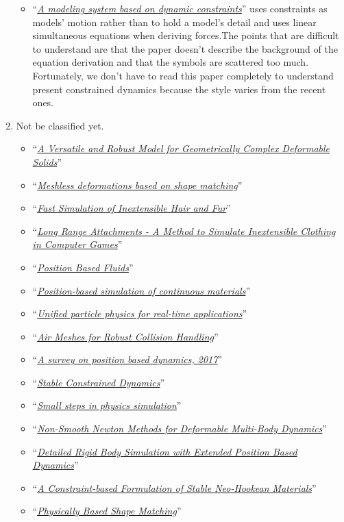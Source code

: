 \documentclass[pdflatex,sn-mathphys-num]{sn-jnl}%
\theoremstyle{thmstyleone}%
\theoremstyle{thmstyletwo}%
\theoremstyle{thmstylethree}%
\newcommand{\pname}[1]{``{\uline{\sl {#1}}}''}
\begin{document}
\begin{enumerate}
\begin{itemize}
		\item \pname{A modeling system based on dynamic constraints}\cite{Barzel1988} uses constraints as models' motion rather than to hold a model's detail and uses linear simultaneous equations when deriving forces.The points that are difficult to understand are that the paper doesn't describe the background of the equation derivation and that the symbols are scattered too much.
		Fortunately, we don't have to read this paper completely to understand present constrained dynamics because the style varies from the recent ones.
		\end{itemize}
	\item Not be classified yet.
		\begin{itemize}
			\item \pname{A Versatile and Robust Model for Geometrically Complex Deformable Solids}\cite{VersatileTeschner}
			\item \pname{Meshless deformations based on shape matching}\cite{MeshlessMuller2005}
			\item \pname{Fast Simulation of Inextensible Hair and Fur}\cite{InextensibleHair}
			\item \pname{Long Range Attachments - A Method to Simulate Inextensible Clothing in Computer Games}\cite{LongRangeAttachments}
			\item \pname{Position Based Fluids}\cite{PosBaseFluids}
			\item \pname{Position-based simulation of continuous materials}\cite{PBContimuousBENDER2014}
			\item \pname{Unified particle physics for real-time applications}\cite{UnifiedParticle}
			\item \pname{Air Meshes for Robust Collision Handling}\cite{AirMesh}
			\item \pname{A survey on position based dynamics, 2017}\cite{PBDCoursenote}
			\item \pname{Stable Constrained Dynamics}\cite{StableConstrainedDyn}
			\item \pname{Small steps in physics simulation}\cite{SmallSteps}
			\item \pname{Non-Smooth Newton Methods for Deformable Multi-Body Dynamics}\cite{NonSmooth}
			\item \pname{Detailed Rigid Body Simulation with Extended Position Based Dynamics}\cite{DetailedRigidbody}
			\item \pname{A Constraint-based Formulation of Stable Neo-Hookean Materials}\cite{ConstrainedBasedNeo-Hookean}
			\item \pname{Physically Based Shape Matching}\cite{PhysBaseShapeMatching}

\end{itemize}
\end{enumerate}
\end{document}
